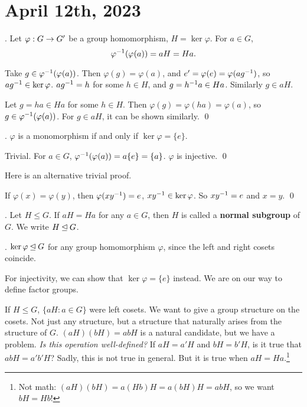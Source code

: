 \section*{April 12th, 2023}

\thm. Let \(\varphi : G \rightarrow G'\) be a group homomorphism, \(H = \ker \varphi\). For \(a \in G\),
\[
    \varphi^{-1}(\varphi(a)) = aH = Ha.
\]

\pf \note{\(\subset\)} Take \(g \in \varphi^{-1}(\varphi(a))\). Then \(\varphi(g) = \varphi(a)\), and \(e' = \varphi(e) = \varphi(ag^{-1})\), so \(ag^{-1} \in \ker\varphi\). \(ag^{-1} = h\) for some \(h \in H\), and \(g = h^{-1} a \in Ha\). Similarly \(g \in aH\).

\note{\(\supset\)} Let \(g = ha \in Ha\) for some \(h \in H\). Then \(\varphi(g) = \varphi(ha) = \varphi(a)\), so \(g \in \varphi^{-1}(\varphi(a))\). For \(g \in aH\), it can be shown similarly. \qed

\cor. \(\varphi\) is a monomorphism if and only if \(\ker\varphi = \{e\}\).

\pf \note{\mimp} Trivial. \note{\mimpd} For \(a \in G\), \(\varphi^{-1}(\varphi(a)) = a \{e\} = \{a\}\). \(\varphi\) is injective. \qed

Here is an alternative trivial proof.

\pf \note{\mimpd} If \(\varphi(x) = \varphi(y)\), then \(\varphi(xy^{-1}) = e\), \(xy^{-1} \in \ker\varphi\). So \(xy^{-1} = e\) and \(x = y\). \qed

.  Let \(H \leq G\). If \(aH = Ha\) for any \(a \in G\), then \(H\) is called a \textbf{normal subgroup} of \(G\). We write \(H \unlhd G\).

\cor. \(\ker\varphi \unlhd G\) for any group homomorphism \(\varphi\), since the left and right cosets coincide.

For injectivity, we can show that \(\ker \varphi = \{e\}\) instead. We are on our way to define factor groups.


If \(H \leq G\), \(\{aH : a \in G\}\) were left cosets. We want to give a group structure on the cosets. Not just any structure, but a structure that naturally arises from the structure of \(G\). \((aH)(bH) = abH\) is a natural candidate, but we have a problem. \textit{Is this operation well-defined?} If \(aH = a'H\) and \(bH = b'H\), is it true that \(abH = a'b'H\)? Sadly, this is not true in general. But it is true when \(aH = Ha\).\footnote{Not math: \((aH)(bH) = a(Hb)H = a(bH)H = abH\), so we want \(bH = Hb\)!}


